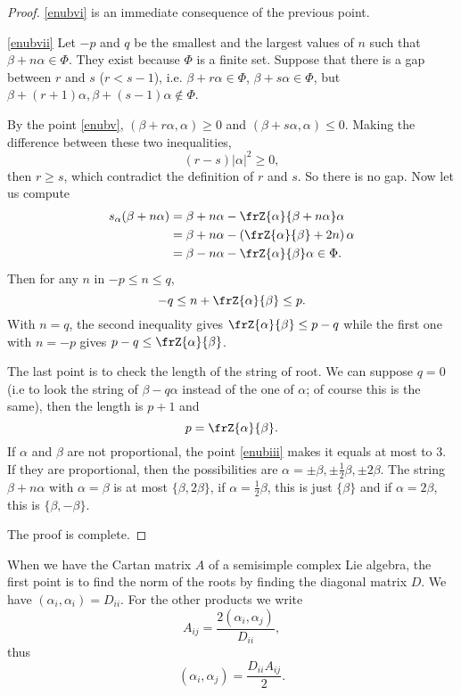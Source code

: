 \begin{proof}
\ref{enubvi} is an immediate consequence of the previous point.

\ref{enubvii} Let $-p$ and $q$ be the smallest and the largest values of $n$ such that $\beta+n\alpha \in\Phi$. They exist because $\Phi$ is a finite set. Suppose that there is a gap between $r$ and $s$ ($r<s-1$), i.e. $\beta+r\alpha\in\Phi$, $\beta+s\alpha\in\Phi$, but $\beta+(r+1)\alpha,\beta+(s-1)\alpha\notin\Phi$.

By the point \ref{enubv}, $(\beta+r\alpha,\alpha)\geq 0$ and $(\beta+s\alpha,\alpha)\leq 0$. Making the difference between these two inequalities,
\[
   (r-s)|\alpha|^2\geq 0,
\]
then $r\geq s$, which contradict the definition of $r$ and $s$. So there is no gap. Now let us compute
\begin{equation}
\begin{split}
   s_{\alpha}(\beta+n\alpha)&=\beta+n\alpha-\frZ{\alpha}{\beta+n\alpha}\alpha\\
                          &=\beta+n\alpha-\left(    \frZ{\alpha}{\beta}+2n    \right)\alpha\\
              &=\beta-n\alpha-\frZ{\alpha}{\beta}\alpha\in\Phi.
\end{split}
\end{equation}
Then for any $n$ in $-p\leq n\leq q$, 
\[
   -q\leq n+\frZ{\alpha}{\beta}\leq p.
\]
With $n=q$, the second inequality gives $\frZ{\alpha}{\beta}\leq p-q$ while the first one with $n=-p$ gives  $p-q\leq\frZ{\alpha}{\beta}$.

The last point is to check the length of the string of root. We can suppose $q=0$ (i.e to look the string of $\beta-q\alpha$ instead of the one of $\alpha$; of course this is the same), then the length is $p+1$ and
\[
   p=\frZ{\alpha}{\beta}.
\]
If $\alpha$ and $\beta$ are not proportional, the point \ref{enubiii} makes it equals at most to $3$. If they are proportional, then the possibilities are $\alpha=\pm\beta,\pm\frac{1}{2}\beta,\pm 2\beta$. The string $\beta+n\alpha$ with $\alpha=\beta$ is at most $\{\beta,2\beta\}$, if $\alpha=\frac{1}{2}\beta$, this is just $\{\beta\}$ and if $\alpha=2\beta$, this is $\{\beta,-\beta\}$.

The proof is complete.
\end{proof}

When we have the Cartan matrix \( A \) of a semisimple complex Lie algebra, the first point is to find the norm of the roots by finding the diagonal matrix \( D\). We have \( (\alpha_i,\alpha_i)=D_{ii}\). For the other products we write
\begin{equation}
    A_{ij}=\frac{ 2(\alpha_i,\alpha_j) }{ D_{ii} },
\end{equation}
thus
\begin{equation}
    (\alpha_i,\alpha_j)=\frac{ D_{ii}A_{ij} }{ 2 }.
\end{equation}

